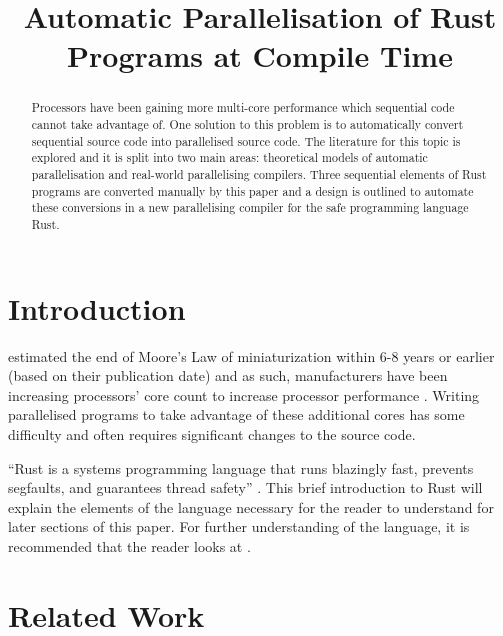 \documentclass[conference]{IEEEtran}
\begin{document}
\title{Automatic Parallelisation of Rust Programs at Compile Time}

\author{
\and
{}
}

\maketitle

\begin{abstract}
  Processors have been gaining more multi-core performance which sequential code cannot take advantage of. One solution to this problem is to automatically convert sequential source code into parallelised source code. The literature for this topic is explored and it is split into two main areas: theoretical models of automatic parallelisation and real-world parallelising compilers. Three sequential elements of Rust programs are converted manually by this paper and a design is outlined to automate these conversions in a new parallelising compiler for the safe programming language Rust.
\end{abstract}

\section{Introduction}
\textcite{Kish2002} estimated the end of Moore's Law of miniaturization within 6-8 years or earlier (based on their publication date) and as such, manufacturers have been increasing processors' core count to increase processor performance \parencite{Geer2005}. Writing parallelised programs to take advantage of these additional cores has some difficulty and often requires significant changes to the source code.


``Rust is a systems programming language that runs blazingly fast, prevents segfaults, and guarantees thread safety'' \parencite{rustlang}. This brief introduction to Rust will explain the elements of the language necessary for the reader to understand for later sections of this paper. For further understanding of the language, it is recommended that the reader looks at \textcite{rustbook}.


\section{Related Work}
\label{sec:related-work}
\end{document}
